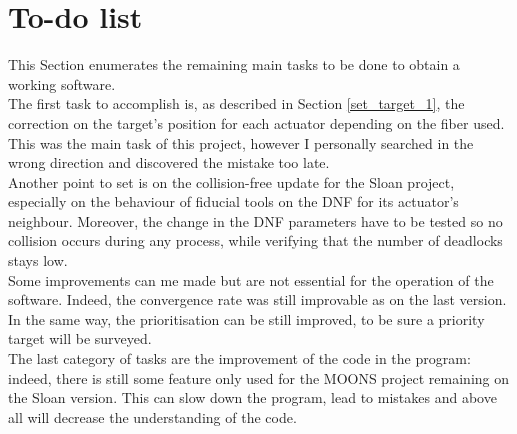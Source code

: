 \section{To-do list} \label{to-do}

This Section enumerates the remaining main tasks to be done to obtain a working software. \\

The first task to accomplish is, as described in Section \ref{set_target_1}, the correction on the target's position for each actuator depending on the fiber used. This was the main task of this project, however I personally searched in the wrong direction and discovered the mistake too late. \\

Another point to set is on the collision-free update for the Sloan project, especially on the behaviour of fiducial tools on the DNF for its actuator's neighbour. Moreover, the change in the DNF parameters have to be tested so no collision occurs during any process, while verifying that the number of deadlocks stays low.\\ 

Some improvements can me made but are not essential for the operation of the software. Indeed, the convergence rate was still improvable as on the last version. In the same way, the prioritisation can be still improved, to be sure a priority target will be surveyed. \\

The last category of tasks are the improvement of the code in the program: indeed, there is still some feature only used for the MOONS project remaining on the Sloan version. This can slow down the program, lead to mistakes and above all will decrease the understanding of the code.